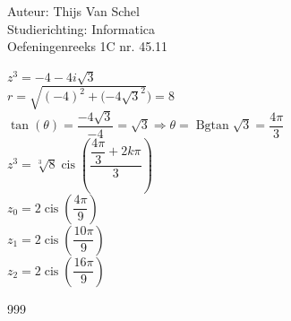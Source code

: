 \documentclass[a4paper]{article}
\begin{document}
  
\noindent \large Auteur: Thijs Van Schel \\
\noindent \large Studierichting: Informatica\\
\noindent \large Oefeningenreeks 1C nr. 45.11\\

\medskip

\normalsize

$z^3 = -4-4i\sqrt{3}$\\

$r = \sqrt{(-4)^2+(-4\sqrt{3}^2}) = 8$\\

$\tan(\theta) = \dfrac{-4\sqrt{3}}{-4} = \sqrt{3} \Rightarrow \theta =\operatorname{Bgtan}\sqrt{3} = \dfrac{4\pi}{3}$\\

$z^3 = \sqrt[3]{8}\operatorname{cis}\left(\dfrac{\dfrac{4\pi}{3}+2k\pi}{3}\right)$\\

$z_0 = 2\operatorname{cis}\left(\dfrac{4\pi}{9}\right)$\\

$z_1 = 2\operatorname{cis}\left(\dfrac{10\pi}{9}\right)$\\

$z_2 = 2\operatorname{cis}\left(\dfrac{16\pi}{9}\right)$\\

\begin{thebibliography}{999}
\end{thebibliography}
\end{document}
